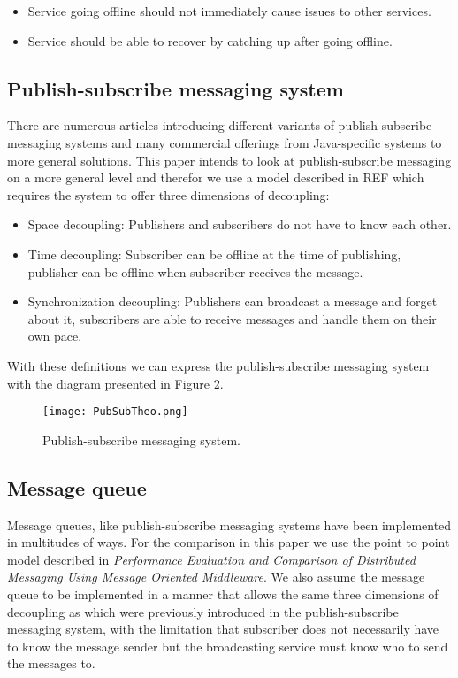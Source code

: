 \documentclass[conference]{IEEEtran}
\begin{document}
\begin{itemize}
    \item Service going offline should not immediately cause issues to other services.
    \item Service should be able to recover by catching up after going offline.
\end{itemize}

\subsection{Publish-subscribe messaging system}
There are numerous articles introducing different variants of publish-subscribe messaging systems and many commercial offerings from Java-specific systems to more general solutions. This paper intends to look at publish-subscribe messaging on a more general level and therefor we use a model described in REF which requires the system to offer three dimensions of decoupling:


\begin{itemize}
    \item Space decoupling: Publishers and subscribers do not have to know each other.
    \item Time decoupling: Subscriber can be offline at the time of publishing, publisher can be offline when subscriber receives the message.
    \item Synchronization decoupling: Publishers can broadcast a message and forget about it, subscribers are able to receive messages and handle them on their own pace.
\end{itemize}
With these definitions we can express the publish-subscribe messaging system with the diagram presented in Figure 2.
\begin{figure}[h]
    \centering
    \texttt{[image: PubSubTheo.png]}
    \caption{Publish-subscribe messaging system.}
\end{figure}


\subsection{Message queue}
Message queues, like publish-subscribe messaging systems have been implemented in multitudes of ways. For the comparison in this paper we use the point to point model described in \textit{Performance Evaluation and Comparison of Distributed Messaging Using Message Oriented Middleware}. We also assume the message queue to be implemented in a manner that allows the same three dimensions of decoupling as which were previously introduced in the publish-subscribe messaging system, with the limitation that subscriber does not necessarily have to know the message sender but the broadcasting service must know who to send the messages to.
\end{document}
